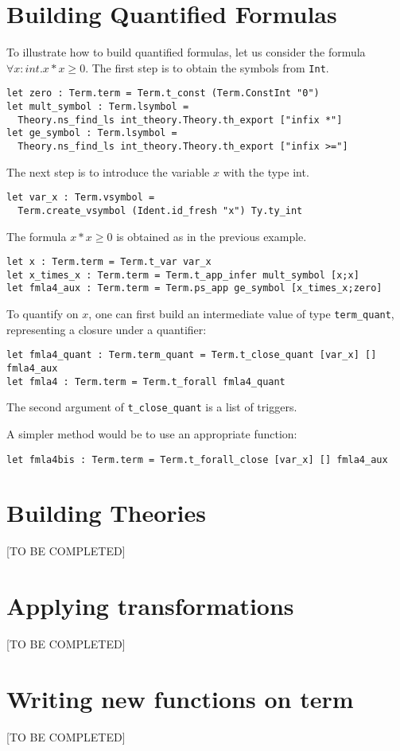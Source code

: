 \section{Building Quantified Formulas}

To illustrate how to build quantified formulas, let us consider
the formula $\forall x:int. x*x \geq 0$. The first step is to
obtain the symbols from \texttt{Int}.
\begin{verbatim}
let zero : Term.term = Term.t_const (Term.ConstInt "0")
let mult_symbol : Term.lsymbol =
  Theory.ns_find_ls int_theory.Theory.th_export ["infix *"]
let ge_symbol : Term.lsymbol =
  Theory.ns_find_ls int_theory.Theory.th_export ["infix >="]
\end{verbatim}
The next step is to introduce the variable $x$ with the type int.
\begin{verbatim}
let var_x : Term.vsymbol =
  Term.create_vsymbol (Ident.id_fresh "x") Ty.ty_int
\end{verbatim}
The formula $x*x \geq 0$ is obtained as in the previous example.
\begin{verbatim}
let x : Term.term = Term.t_var var_x
let x_times_x : Term.term = Term.t_app_infer mult_symbol [x;x]
let fmla4_aux : Term.term = Term.ps_app ge_symbol [x_times_x;zero]
\end{verbatim}
To quantify on $x$, one can first build an intermediate
value of type \texttt{term\_quant}, representing a closure
under a quantifier:
\begin{verbatim}
let fmla4_quant : Term.term_quant = Term.t_close_quant [var_x] [] fmla4_aux
let fmla4 : Term.term = Term.t_forall fmla4_quant
\end{verbatim}
The second argument of \texttt{t\_close\_quant} is a list of triggers.

A simpler method would be to use an appropriate function:
\begin{verbatim}
let fmla4bis : Term.term = Term.t_forall_close [var_x] [] fmla4_aux
\end{verbatim}

\section{Building Theories}

[TO BE COMPLETED]

\section{Applying transformations}

[TO BE COMPLETED]

\section{Writing new functions on term}

[TO BE COMPLETED]




